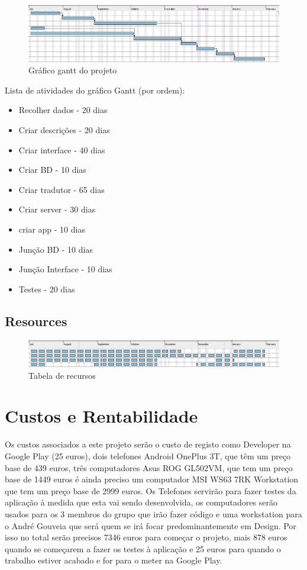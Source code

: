 \documentclass[a4paper]{article}
\begin{document}
\begin{figure}[!ht]
\centering
\includegraphics[width=120mm]{gantt.png}
\caption{Gráfico gantt do projeto}
\end{figure}

Lista de atividades do gráfico Gantt (por ordem):
\begin{itemize}
\item Recolher dados - 20 dias
\item Criar descrições - 20 dias
\item Criar interface - 40 dias
\item Criar BD - 10 dias
\item Criar tradutor - 65 dias
\item Criar server - 30 dias
\item criar app - 10 dias
\item Junção BD - 10 dias
\item Junção Interface - 10 dias
\item Testes - 20 dias
\end{itemize}

\newpage

\subsection{Resources}

\begin{figure}[!ht]
\centering
\includegraphics[width=120mm]{resurces.png}
\caption{Tabela de recursos}
\end{figure}

\section{Custos e Rentabilidade}

Os custos associados a este projeto serão o custo de registo como Developer na Google Play (25 euros), dois telefones Android OnePlus 3T, que têm um preço base de 439 euros, três computadores Asus ROG GL502VM, que tem um preço base de 1449 euros é ainda preciso um computador MSI WS63 7RK Workstation que tem um preço base de 2999 euros. Os Telefones servirão para fazer testes da aplicação à medida que esta vai sendo desenvolvida, os computadores serão usados para os 3 membros do grupo que irão fazer código e uma workstation para o André Gouveia que será quem se irá focar predominantemente em Design. Por isso no total serão precisos 7346 euros para começar o projeto, mais 878 euros quando se começarem a fazer os testes à aplicação e 25 euros para quando o trabalho estiver acabado e for para o meter na Google Play.
\end{document}
